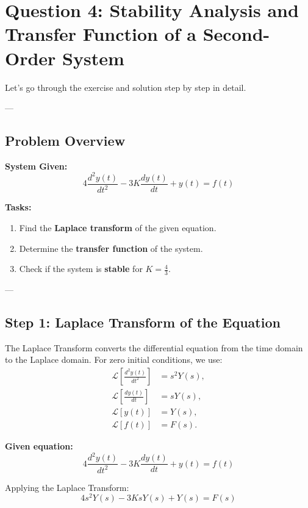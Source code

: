 \documentclass[12pt]{article}
\begin{document}
\newpage

\section*{Question 4: Stability Analysis and Transfer Function of a Second-Order System}

Let’s go through the exercise and solution step by step in detail.

---

\subsection*{Problem Overview}

\textbf{System Given:}
\[
4 \frac{d^2y(t)}{dt^2} - 3K \frac{dy(t)}{dt} + y(t) = f(t)
\]

\textbf{Tasks:}
\begin{enumerate}
    \item Find the \textbf{Laplace transform} of the given equation.
    \item Determine the \textbf{transfer function} of the system.
    \item Check if the system is \textbf{stable} for \( K = \frac{4}{3} \).
\end{enumerate}

---

\subsection*{Step 1: Laplace Transform of the Equation}

The Laplace Transform converts the differential equation from the time domain to the Laplace domain. For zero initial conditions, we use:
\begin{align*}
    \mathcal{L}\left[\frac{d^2y(t)}{dt^2}\right] &= s^2 Y(s), \\
    \mathcal{L}\left[\frac{dy(t)}{dt}\right] &= s Y(s), \\
    \mathcal{L}[y(t)] &= Y(s), \\
    \mathcal{L}[f(t)] &= F(s).
\end{align*}

\textbf{Given equation:}
\[
4 \frac{d^2y(t)}{dt^2} - 3K \frac{dy(t)}{dt} + y(t) = f(t)
\]

Applying the Laplace Transform:
\[
4 s^2 Y(s) - 3K s Y(s) + Y(s) = F(s)
\]
\end{document}
